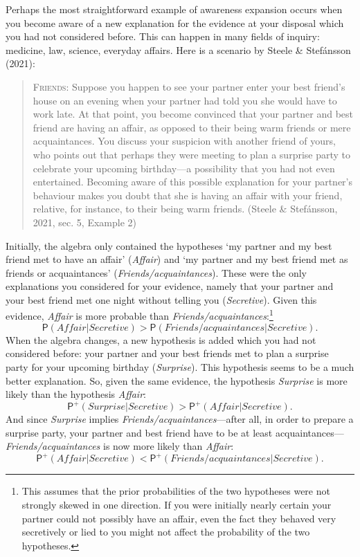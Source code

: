 \documentclass[
  11pt,
  dvipsnames,enabledeprecatedfontcommands]{scrartcl}
\newcommand{\pr}[1]{\ensuremath{\mathsf{P}(#1)}}
\newcommand{\ppr}[2]{\ensuremath{\mathsf{P}^{#1}(#2)}}
\begin{document}
Perhaps the most straightforward example of awareness expansion occurs
when you become aware of a new explanation for the evidence at your
disposal which you had not considered before. This can happen in many
fields of inquiry: medicine, law, science, everyday affairs. Here is a
scenario by Steele \& Stefánsson (2021):

\begin{quote}
\textsc{Friends}: Suppose you happen to see your partner enter your best
friend's house on an evening when your partner had told you she would
have to work late. At that point, you become convinced that your partner
and best friend are having an affair, as opposed to their being warm
friends or mere acquaintances. You discuss your suspicion with another
friend of yours, who points out that perhaps they were meeting to plan a
surprise party to celebrate your upcoming birthday---a possibility that
you had not even entertained. Becoming aware of this possible
explanation for your partner's behaviour makes you doubt that she is
having an affair with your friend, relative, for instance, to their
being warm friends. (Steele \& Stefánsson, 2021, sec. 5, Example 2)
\end{quote}

\doublespace

\noindent Initially, the algebra only contained the hypotheses `my
partner and my best friend met to have an affair' (\textit{Affair}) and
`my partner and my best friend met as friends or acquaintances'
(\textit{Friends/acquaintances}). These were the only explanations you
considered for your evidence, namely that your partner and your best
friend met one night without telling you (\textit{Secretive}). Given
this evidence, \textit{Affair} is more probable than
\textit{Friends/acquaintances}:\footnote{This assumes that the prior
  probabilities of the two hypotheses were not strongly skewed in one
  direction. If you were initially nearly certain your partner could not
  possibly have an affair, even the fact they behaved very secretively
  or lied to you might not affect the probability of the two hypotheses.}
\[\pr{\textit{Affair} \vert  \textit{Secretive} }> \pr{\textit{Friends/acquaintances} \vert \textit{Secretive}} \tag{>}.\]
When the algebra changes, a new hypothesis is added which you had not
considered before: your partner and your best friends met to plan a
surprise party for your upcoming birthday (\textit{Surprise}). This
hypothesis seems to be a much better explanation. So, given the same
evidence, the hypothesis \textit{Surprise} is more likely than the
hypothesis \textit{Affair}:
\[\ppr{+}{ \textit{Surprise} \vert \textit{Secretive}}> \ppr{+}{ \textit{Affair} \vert \textit{Secretive}}.\]
And since \textit{Surprise} implies
\textit{Friends/acquaintances}---after all, in order to prepare a
surprise party, your partner and best friend have to be at least
acquaintances--- \textit{Friends/acquaintances} is now more likely than
\textit{Affair}:
\[\ppr{+}{\textit{Affair} \vert  \textit{Secretive} } < \ppr{+}{\textit{Friends/acquaintances} \vert \textit{Secretive}}. \tag{<}\]
\end{document}
